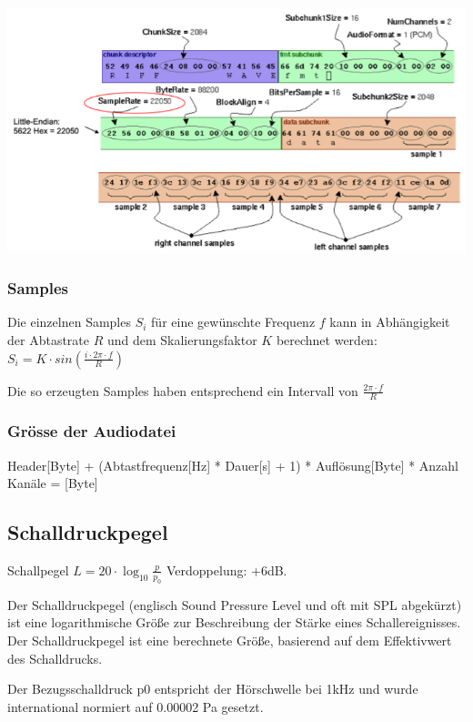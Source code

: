 \begin{center}
    \includegraphics[width=1\linewidth]{images/wavebsp.png}
\end{center}

\subsubsection{Samples}%
\label{ssub:samples}
Die einzelnen Samples $S_i$ für eine gewünschte Frequenz $f$ kann in Abhängigkeit der Abtastrate $R$ und dem Skalierungsfaktor $K$ berechnet werden: $S_i = K \cdot sin(\frac{i \cdot 2 \pi \cdot f}{R})$

Die so erzeugten Samples haben entsprechend ein Intervall von $\frac{2\pi \cdot f}{R}$

\subsubsection{Grösse der Audiodatei}%
\label{ssub:grösse_der_audiodatei}
Header[Byte] + (Abtastfrequenz[Hz] * Dauer[s] + 1) * Auflösung[Byte] * Anzahl Kanäle = [Byte]

\subsection{Schalldruckpegel}%
Schallpegel $L=20 \cdot \log_{10} \frac{p}{p_0}$ Verdoppelung: +6dB.

Der Schalldruckpegel (englisch Sound Pressure Level und oft mit SPL abgekürzt) ist eine
logarithmische Größe zur Beschreibung der Stärke eines Schallereignisses. Der
Schalldruckpegel ist eine berechnete Größe, basierend auf dem Effektivwert des
Schalldrucks.

Der Bezugsschalldruck p0 entspricht der Hörschwelle bei 1kHz und wurde international
normiert auf 0.00002 Pa gesetzt. 

